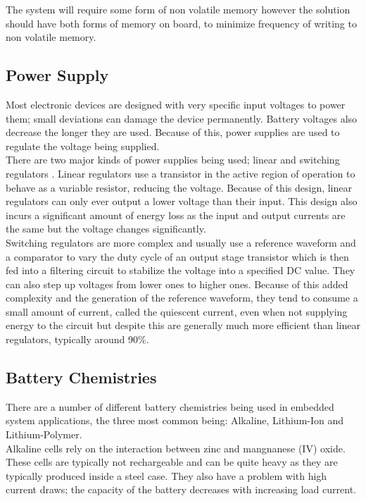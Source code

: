 \documentclass[12pt,openany,a4paper]{book}
\begin{document}
			The system will require some form of non volatile memory however the solution should have both forms of memory on board, to minimize frequency of writing to non volatile memory.
			
		\subsection{Power Supply}
			Most electronic devices are designed with very specific input voltages to power them; small deviations can damage the device permanently. Battery voltages also decrease the longer they are used. Because of this, power supplies are used to regulate the voltage being supplied. \\
			
			There are two major kinds of power supplies being used; linear and switching regulators \cite{TI2011}. Linear regulators use a transistor in the active region of operation to behave as a variable resistor, reducing the voltage. Because of this design, linear regulators can only ever output a lower voltage than their input. This design also incurs a significant amount of energy loss as the input and output currents are the same but the voltage changes significantly. \\
			
			Switching regulators are more complex and usually use a reference waveform and a comparator to vary the duty cycle of an output stage transistor which is then fed into a filtering circuit to stabilize the voltage into a specified DC value. They can also step up voltages from lower ones to higher ones. Because of this added complexity and the generation of the reference waveform, they tend to consume a small amount of current, called the quiescent current, even when not supplying energy to the circuit but despite this are generally much more efficient than linear regulators, typically around 90\%. 
			
		\subsection{Battery Chemistries}
			There are a number of different battery chemistries being used in embedded system applications, the three most common being: Alkaline, Lithium-Ion and Lithium-Polymer. \\
			
			Alkaline cells rely on the interaction between zinc and mangnanese (IV) oxide. These cells are typically not rechargeable and can be quite heavy as they are typically produced inside a steel case. They also have a problem with high current draws; the capacity of the battery decreases with increasing load current. \\
			
\end{document}
